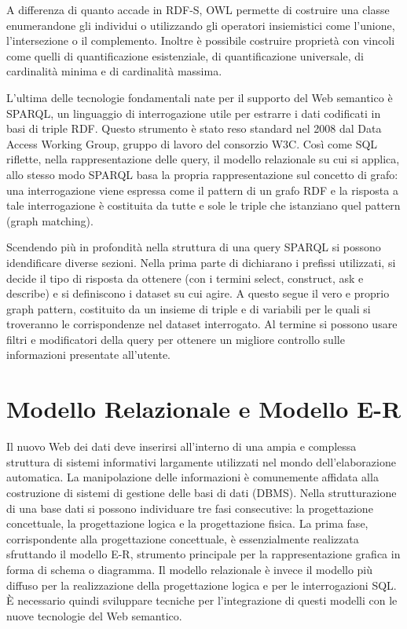 \documentclass[Lau,binding=0.6cm,noexaminfo]{sapthesis}
\begin{document}
A differenza di quanto accade in RDF-S, OWL permette di costruire una classe enumerandone gli individui o utilizzando gli operatori insiemistici come l'unione, l'intersezione o il complemento. Inoltre è possibile costruire proprietà con vincoli come quelli di quantificazione esistenziale,  di quantificazione universale, di cardinalità minima e di cardinalità massima.\medskip

L'ultima delle tecnologie fondamentali nate per il supporto del Web semantico è SPARQL, un linguaggio di interrogazione utile per estrarre i dati codificati in basi di triple RDF. Questo strumento è stato reso standard nel 2008 dal Data Access Working Group, gruppo di lavoro del consorzio W3C. Così come SQL riflette, nella rappresentazione delle query, il modello relazionale su cui si applica, allo stesso modo SPARQL basa la propria rappresentazione sul concetto di grafo: una interrogazione viene espressa come il pattern di un grafo RDF e la risposta a tale interrogazione è costituita da tutte e sole le triple che istanziano quel pattern (graph matching).\medskip

Scendendo più in profondità nella struttura di una query SPARQL si possono idendificare diverse sezioni. Nella prima parte di dichiarano i prefissi utilizzati, si decide il tipo di risposta da ottenere (con i termini select, construct, ask e describe) e si definiscono i dataset su cui agire. A questo segue il vero e proprio graph pattern, costituito da un insieme di triple e di variabili per le quali si troveranno le corrispondenze nel dataset interrogato. Al termine si possono usare filtri e modificatori della query per ottenere un migliore controllo sulle informazioni presentate all'utente.\medskip

\clearpage

\section{Modello Relazionale e Modello E-R}

Il nuovo Web dei dati deve inserirsi all'interno di una ampia e complessa struttura di sistemi informativi largamente utilizzati nel mondo dell'elaborazione automatica. La manipolazione delle informazioni è comunemente affidata alla costruzione di sistemi di gestione delle basi di dati (DBMS). Nella strutturazione di una base dati si possono individuare tre fasi consecutive: la progettazione concettuale, la progettazione logica e la progettazione fisica.
La prima fase, corrispondente alla progettazione concettuale, è essenzialmente realizzata sfruttando il modello E-R, strumento principale per la rappresentazione grafica in forma di schema o diagramma. Il modello relazionale è invece il modello più diffuso per la realizzazione della progettazione logica e per le interrogazioni SQL. \MakeUppercase{è} necessario quindi sviluppare tecniche per l'integrazione di questi modelli con le nuove tecnologie del Web semantico.\medskip
\end{document}
